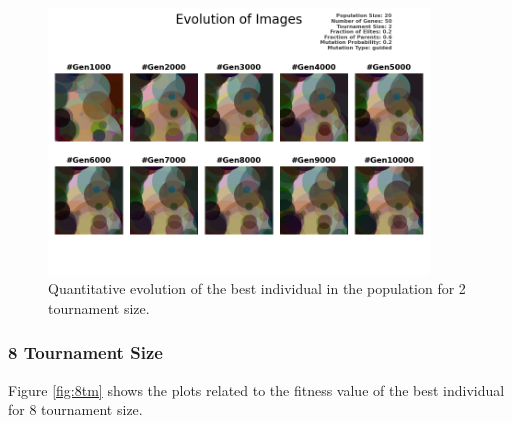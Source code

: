 \documentclass{assignment}
\begin{document}
\begin{figure}[!htb]
    \centering
    \includegraphics[width=0.9\textwidth]{figures/images_output_20_50_2_0.2_0.6_0.2_guided.png}
    \caption{Quantitative evolution of the best individual in the population for 2 tournament size.}
    \label{fig:2tm_image}
\end{figure}

\subsubsection{8 Tournament Size}
Figure \ref{fig:8tm} shows the plots related to the fitness value of the best individual for 8 tournament size.
\end{document}
